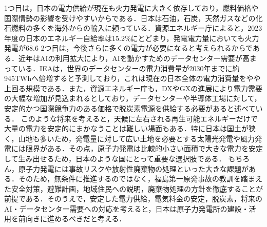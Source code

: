 1つ目は，日本の電力供給が現在も火力発電に大きく依存しており，燃料価格や国際情勢の影響を受けやすいからである．日本は石油，石炭，天然ガスなどの化石燃料の多くを海外からの輸入に頼っている．資源エネルギー庁によると，2023年度の日本のエネルギー自給率は15.2\%にとどまり，発電電力量においても火力発電が68.6%
2つ目は，今後さらに多くの電力が必要になると考えられるからである．近年はAIの利用拡大により，AIを動かすためのデータセンター需要が高まっている．IEAは，世界のデータセンターの電力消費量が2030年までに約945TWhへ倍増すると予測しており，これは現在の日本全体の電力消費量をやや上回る規模である．また，資源エネルギー庁も，DXやGXの進展により電力需要の大幅な増加が見込まれるとしており，データセンターや半導体工場に対して，安定的かつ国際競争力のある価格で脱炭素電源を供給する必要があると述べている．
このような将来を考えると，天候に左右される再生可能エネルギーだけで大量の電力を安定的にまかなうことは難しい場面もある．特に日本は国土が狭く，山地も多いため，発電量に対して広い土地を必要とする太陽光発電や風力発電には限界がある．その点，原子力発電は比較的小さい面積で大きな電力を安定して生み出せるため，日本のような国にとって重要な選択肢である．
もちろん，原子力発電には事故リスクや放射性廃棄物の処理といった大きな課題がある．そのため，無条件に推進するのではなく，福島第一原発事故の教訓を踏まえた安全対策，避難計画，地域住民への説明，廃棄物処理の方針を徹底することが前提である．そのうえで，安定した電力供給，電気料金の安定，脱炭素，将来のAI・データセンター需要への対応を考えると，日本は原子力発電所の建設・活用を前向きに進めるべきだと考える．